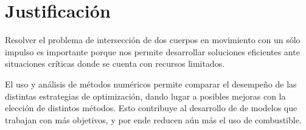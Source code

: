 \section{Justificación}

Resolver el problema de intersección de dos cuerpos en movimiento
con un sólo impulso es importante porque nos permite desarrollar
soluciones eficientes ante situaciones críticas donde se cuenta
con recursos limitados.

El uso y análisis de métodos numéricos permite comparar el desempeño de las distintas
estrategias de optimización, dando lugar a posibles mejoras con la elección de distintos
métodos. Esto contribuye al desarrollo de de modelos que trabajan con más objetivos, y por
ende reducen aún más el uso de combustible.
